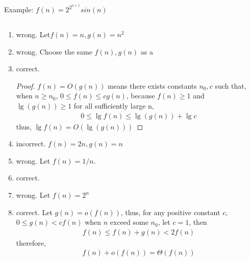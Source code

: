 \documentclass[paper=a4, fontsize=11pt,oneside]{book} %
\numberwithin{equation}{section} %
\numberwithin{figure}{section} %
\numberwithin{table}{section} %
\begin{document}
		    
		    Example: $f(n) = 2^{2^{n+1}}sin(n)$
		    
		\subsection{}
			\begin{enumerate}
				\item wrong. Let$f(n) = n, g(n) = n^2$
				\item wrong. Choose the same $f(n), g(n)$ as {\color{cyan} a}
				\item correct.
					\begin{proof}
						$f(n) = O(g(n))$ means there exists constants $n_0, c$ such that,
						when $n \geq n_0$, $0 \leq f(n) \leq cg(n)$, because $f(n) \geq 1$ and 
						$\lg(g(n))\geq 1$ for all sufficiently large n,
						\begin{align*}
						0 \leq \lg f(n) \leq \lg(g(n)) + \lg c
						\end{align*}
						thus, $\lg f(n) = O(\lg(g(n)))$
					\end{proof}
			\item incorrect. $f(n) = 2n, g(n) = n$
			\item wrong. Let $f(n) = 1/n$.
			\item correct.
			\item wrong. Let $f(n) = 2^n$
			\item correct. Let $g(n) = o(f(n))$,
			thus, for any positive constant $c$, $0 \leq g(n) < cf(n)$ when $n$ exceed some $n_0$, let $c = 1$, then
			\begin{align*}
			f(n) \leq f(n) + g(n) < 2f(n)
			\end{align*} 
			therefore,
			\begin{align*}
			f(n) + o(f(n)) = \Theta(f(n))
			\end{align*}
			\end{enumerate}
			
\end{document}

